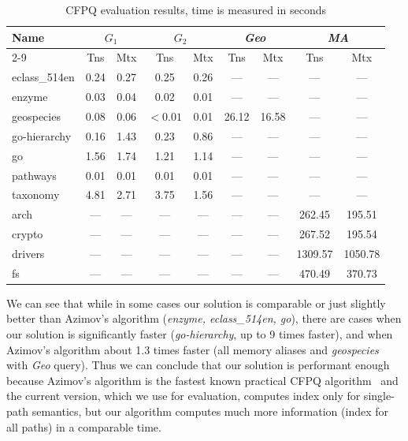 {\setlength{\tabcolsep}{0.2em}
  \begin{table}[h]
    \centering
    \caption{CFPQ evaluation results, time is measured in seconds}
    \label{tbl:CFPQ_index}
    \small
    \begin{tabular}{| l | c | c | c | c | c | c | c | c |}
      \hline

      \multirow{2}{*}{Name}  & \multicolumn{2}{c|}{$G_1$} & \multicolumn{2}{c|}{$G_2$} & \multicolumn{2}{c|}{\textit{Geo}} & \multicolumn{2}{c|}{\textit{MA}}\\
      \cline{2-9}
                      & Tns    & Mtx    & Tns  & Mtx  & Tns   & Mtx   & Tns     & Mtx \\
      \hline
      \hline
      eclass\_514en   & 0.24   & 0.27   & 0.25 & 0.26 & ---   & ---   & ---     & ---\\
      enzyme          & 0.03   & 0.04   & 0.02 & 0.01 & ---   & ---   & ---     & ---\\
      geospecies      & 0.08   & 0.06   & $<0.01$ & 0.01 & 26.12 & 16.58 & ---     & ---\\
      go-hierarchy    & 0.16   & 1.43   & 0.23 & 0.86 & ---   & ---   & ---     & ---\\
      go              & 1.56   & 1.74   & 1.21 & 1.14 & ---   & ---   & ---     & ---\\
      pathways        & 0.01   & 0.01   & 0.01 & 0.01 & ---   & ---   & ---     & ---\\
      taxonomy        & 4.81   & 2.71   & 3.75 & 1.56 & ---   & ---   & ---     & ---\\
      \hline
      arch            & ---    & ---    & ---  & ---  & ---   & ---   & 262.45  & 195.51  \\
      crypto          & ---    & ---    & ---  & ---  & ---   & ---   & 267.52  & 195.54  \\
      drivers         & ---    & ---    & ---  & ---  & ---   & ---   & 1309.57 & 1050.78 \\
      fs              & ---    & ---    & ---  & ---  & ---   & ---   & 470.49  & 370.73  \\
      \hline
    \end{tabular}
  \end{table}
}

We can see that while in some cases our solution is comparable or just slightly better than Azimov's algorithm (\textit{enzyme, eclass\_514en, go}), there are cases when our solution is significantly faster (\textit{go-hierarchy}, up to 9 times faster), and when Azimov's algorithm about 1.3 times faster (all memory aliases and \textit{geospecies} with \textit{Geo} query).
Thus we can conclude that our solution is performant enough because Azimov's algorithm is the fastest known practical CFPQ algorithm~\cite{10.1145/3398682.3399163} and the current version, which we use for evaluation, computes index only for single-path semantics, but our algorithm computes much more information (index for all paths) in a comparable time.


